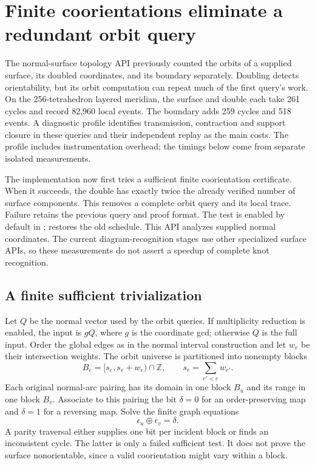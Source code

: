 \section{Finite coorientations eliminate a redundant orbit query}
\label{sec:normal-coorientation}

The normal-surface topology API previously counted the orbits of a supplied
surface, its doubled coordinates, and its boundary separately. Doubling
detects orientability, but its orbit computation can repeat much of the
first query's work. On the 256-tetrahedron layered meridian, the surface and
double each take 261 cycles and record 82,960 local events. The boundary
adds 259 cycles and 518 events. A diagnostic profile identifies transmission,
contraction and support closure in these queries and their independent
replay as the main costs. The profile includes instrumentation overhead;
the timings below come from separate isolated measurements.

The implementation now first tries a sufficient finite coorientation
certificate. When it succeeds, the double has exactly twice the already
verified number of surface components. This removes a complete orbit query
and its local trace. Failure retains the previous query and proof format.
The test is enabled by default in ;
 restores the old schedule. This API analyzes
supplied normal coordinates. The current diagram-recognition stages use
other specialized surface APIs, so these measurements do not assert a
speedup of complete knot recognition.

\subsection{A finite sufficient trivialization}

Let $Q$ be the normal vector used by the orbit queries. If multiplicity
reduction is enabled, the input is $gQ$, where $g$ is the coordinate gcd;
otherwise $Q$ is the full input. Order the global edges as in the normal
interval construction and let $w_e$ be their intersection weights. The
orbit universe is partitioned into nonempty blocks
\[
 B_e=[s_e,s_e+w_e)\cap\mathbb Z,\qquad
 s_e=\sum_{e'<e}w_{e'}.
\]
Each original normal-arc pairing has its domain in one block $B_u$ and
its range in one block $B_v$. Associate to this pairing the bit
$\delta=0$ for an order-preserving map and $\delta=1$ for a reversing map.
Solve the finite graph equations
\[
 \epsilon_u\mathbin\oplus\epsilon_v=\delta.
\]
A parity traversal either supplies one bit per incident block or finds an
inconsistent cycle. The latter is only a failed sufficient test. It does
not prove the surface nonorientable, since a valid coorientation might
vary within a block.

